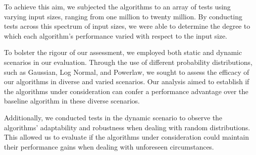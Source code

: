 To achieve this aim, we subjected the algorithms to an array of tests using varying input sizes, ranging from one million to twenty million. By conducting tests across this spectrum of input sizes, we were able to determine the degree to which each algorithm's performance varied with respect to the input size.

To bolster the rigour of our assessment, we employed both static and dynamic scenarios in our evaluation. Through the use of different probability distributions, such as Gaussian, Log Normal, and Powerlaw, we sought to assess the efficacy of our algorithms in diverse and varied scenarios. Our analysis aimed to establish if the algorithms under consideration can confer a performance advantage over the baseline algorithm in these diverse scenarios.

Additionally, we conducted tests in the dynamic scenario to observe the algorithms' adaptability and robustness when dealing with random distributions. This allowed us to evaluate if the algorithms under consideration could maintain their performance gains when dealing with unforeseen circumstances.

